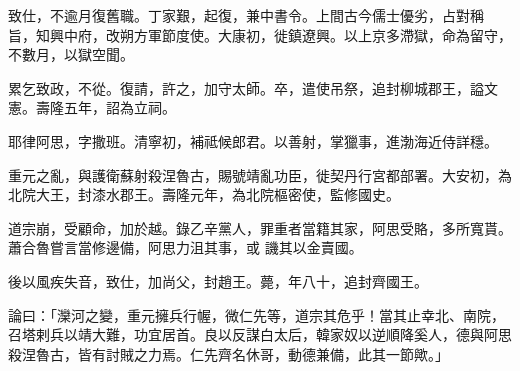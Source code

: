 \begin{pinyinscope}
 致仕，不逾月復舊職。丁家艱，起復，兼中書令。上間古今儒士優劣，占對稱
 旨，知興中府，改朔方軍節度使。大康初，徙鎮遼興。以上京多滯獄，命為留守，不數月，以獄空聞。



 累乞致政，不從。復請，許之，加守太師。卒，遣使吊祭，追封柳城郡王，謚文憲。壽隆五年，詔為立祠。



 耶律阿思，字撒班。清寧初，補祗候郎君。以善射，掌獵事，進渤海近侍詳穩。



 重元之亂，與護衛蘇射殺涅魯古，賜號靖亂功臣，徙契丹行宮都部署。大安初，為北院大王，封漆水郡王。壽隆元年，為北院樞密使，監修國史。



 道宗崩，受顧命，加於越。錄乙辛黨人，罪重者當籍其家，阿思受賂，多所寬貰。蕭合魯嘗言當修邊備，阿思力沮其事，或
 譏其以金賣國。



 後以風疾失音，致仕，加尚父，封趙王。薨，年八十，追封齊國王。



 論曰：「灤河之變，重元擁兵行幄，微仁先等，道宗其危乎！當其止幸北、南院，召塔剌兵以靖大難，功宜居首。良以反謀白太后，韓家奴以逆順降奚人，德與阿思殺涅魯古，皆有討賊之力焉。仁先齊名休哥，動德兼備，此其一節歟。」



\end{pinyinscope}